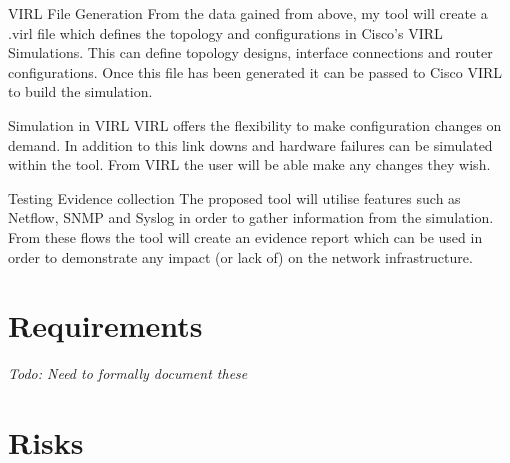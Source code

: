 \documentclass[11pt]{report}
\begin{document}
VIRL File Generation
From the data gained from above, my tool will create a .virl file which defines the topology and configurations in Cisco’s VIRL Simulations. This can define topology designs, interface connections and router configurations. Once this file has been generated it can be passed to Cisco VIRL to build the simulation.

Simulation in VIRL
VIRL offers the flexibility to make configuration changes on demand. In addition to this link downs and hardware failures can be simulated within the tool. From VIRL the user will be able make any changes they wish.

Testing Evidence collection
The proposed tool will utilise features such as Netflow, SNMP and Syslog in order to gather information from the simulation. From these flows the tool will create an evidence report which can be used in order to demonstrate any impact (or lack of) on the network infrastructure.

\section{Requirements}

\textit{Todo: Need to formally document these}

\section{Risks}
\end{document}
